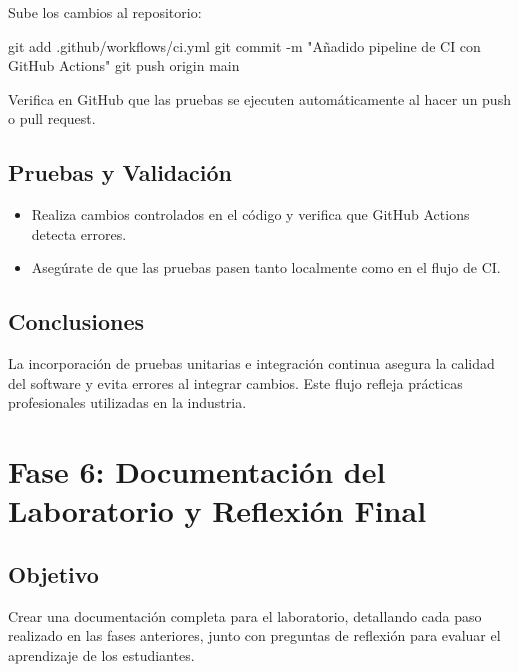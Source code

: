\documentclass[
  a4paper,
  DIV=11,
  numbers=noendperiod,
  onepage,
  openany]{scrreprt}
\newenvironment{Shaded}{\begin{snugshade}}{\end{snugshade}}
\newcommand{\AttributeTok}[1]{\textcolor[rgb]{0.40,0.45,0.13}{#1}}
\newcommand{\FunctionTok}[1]{\textcolor[rgb]{0.28,0.35,0.67}{#1}}
\newcommand{\NormalTok}[1]{\textcolor[rgb]{0.00,0.23,0.31}{#1}}
\newcommand{\StringTok}[1]{\textcolor[rgb]{0.13,0.47,0.30}{#1}}
\providecommand{\tightlist}{%
  \setlength{\itemsep}{0pt}\setlength{\parskip}{0pt}}\usepackage{longtable,booktabs,array}
\begin{document}
Sube los cambios al repositorio:

\begin{Shaded}
\begin{Highlighting}[]
\FunctionTok{git}\NormalTok{ add .github/workflows/ci.yml}
\FunctionTok{git}\NormalTok{ commit }\AttributeTok{{-}m} \StringTok{"Añadido pipeline de CI con GitHub Actions"}
\FunctionTok{git}\NormalTok{ push origin main}
\end{Highlighting}
\end{Shaded}

Verifica en GitHub que las pruebas se ejecuten automáticamente al hacer
un push o pull request.

\section{Pruebas y Validación}\label{pruebas-y-validaciuxf3n}

\begin{itemize}
\tightlist
\item
  Realiza cambios controlados en el código y verifica que GitHub Actions
  detecta errores.
\item
  Asegúrate de que las pruebas pasen tanto localmente como en el flujo
  de CI.
\end{itemize}

\section{Conclusiones}\label{conclusiones-17}

La incorporación de pruebas unitarias e integración continua asegura la
calidad del software y evita errores al integrar cambios. Este flujo
refleja prácticas profesionales utilizadas en la industria.

\chapter{Fase 6: Documentación del Laboratorio y Reflexión
Final}\label{fase-6-documentaciuxf3n-del-laboratorio-y-reflexiuxf3n-final}

\section{Objetivo}\label{objetivo-6}

Crear una documentación completa para el laboratorio, detallando cada
paso realizado en las fases anteriores, junto con preguntas de reflexión
para evaluar el aprendizaje de los estudiantes.
\end{document}
